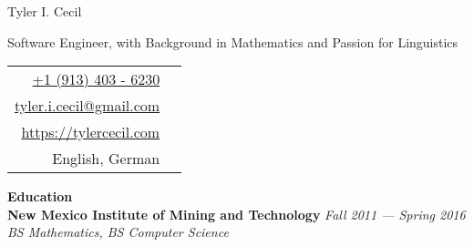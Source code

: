 \documentclass[11pt,a4paper,sans]{article}
\newcommand{\cvcolor}[1]{{\color{MidnightBlue}#1}}
\renewcommand{\section}[1]{
  \cvcolor{\noindent \textbf{\LARGE #1}}
  \vspace{.5em}\\
}
\begin{document}
\noindent
\begin{minipage}{0.675\linewidth}
 {
 \fontsize{40pt}{50pt}\selectfont
 \noindent
 {Tyler I. Cecil}}\\
 {\Large \color{darkgray} {
   \vspace{-1em}

   \noindent
   Software Engineer, with Background in Mathematics
   and Passion for Linguistics
 }}
\end{minipage}
\hfill
\begin{tabular}{|rl}
  \href{tel:+1 (913) 403 - 6230}{+1 (913) 403 - 6230}&\cvcolor{\faPhone} \\
  \href{mailto:tyler.i.cecil@gmail.com}{tyler.i.cecil@gmail.com}&\cvcolor{\faEnvelope} \\
  \href{https://tylercecil.com}{https://tylercecil.com}&\cvcolor{\faGlobe} \\
  English, German & \cvcolor{\faLanguage} \\
\end{tabular}

\vspace{0.5em}
\hline
\vspace{1em}

\section{Education}
\textbf{New Mexico Institute of Mining and Technology} \hfill \textsl{Fall 2011 --- Spring 2016}\\
\textsl{BS Mathematics, BS Computer Science}\\
\end{document}
